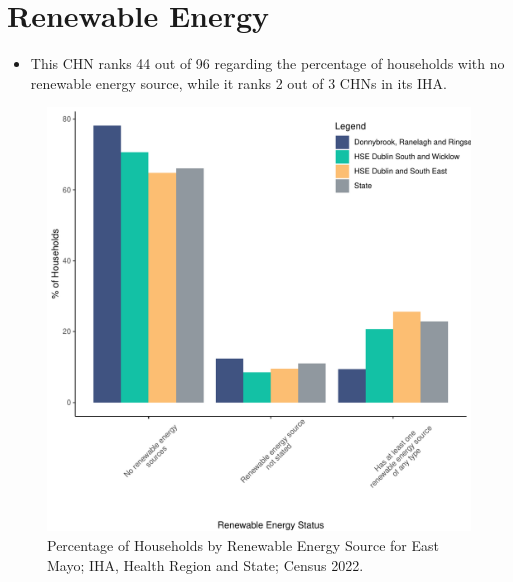 \documentclass{article}
\begin{document}
\section{Renewable Energy}\label{sect:RE}
\begin{itemize}
\item This CHN ranks  44 out of 96 regarding the percentage of households with no renewable energy source, while it ranks   2 out of 3 CHNs in its IHA.
\end{itemize}
\begin{figure}[H]
	\centering
	\includegraphics[width = 140mm]{../figures/RenewableEnergyED.pdf}
	\caption{Percentage of Households by Renewable Energy Source for East Mayo; IHA, Health Region and State; Census 2022.}
	\label{fig:vbnv}
	\end{figure}
\end{document}
